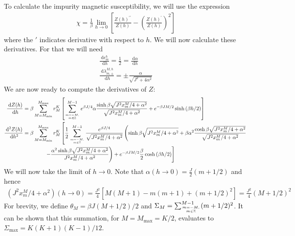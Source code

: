 \documentclass{revtex4-2}
\begin{document}
To calculate the impurity magnetic susceptibility, we will use the expression
\begin{align}
	\chi = \frac{1}{\beta}\lim_{h \to 0}\left[\frac{Z(h)^{\prime\prime}}{Z(h)} - \left(\frac{Z(h)^{\prime}}{Z(h)}\right)^2 \right] 
\end{align}
where the \(\prime\) indicates derivative with respect to \(h\). We will now calculate these derivatives. For that we will need
\begin{gather}
	\frac{\:\mathrm{d}\epsilon_m^h}{\:\mathrm{d}h} = \frac{1}{2} = \frac{\:\mathrm{d}\alpha}{\:\mathrm{d}h}\\
	\frac{\:\mathrm{d}\lambda_{m,\pm}^{M, h}}{\:\mathrm{d}h} = \pm\frac{\alpha}{\sqrt{J^2 + 4\alpha^2}}
\end{gather}
We are now ready to compute the derivatives of \(Z\):
\begin{align}
	\frac{\:\mathrm{d}Z(h)}{\:\mathrm{d}h} &= \beta\sum_{M=M_\text{min}}^{M_\text{max}}r^K_M\left[\sum_{m=-M, \atop{m\in \mathbb{Z}}}^{M-1}e^{\beta J/4}\alpha\frac{\sinh \beta\sqrt{J^2x^M_m/4 + \alpha^2} }{\sqrt{J^2x^M_m/4 + \alpha^2}} + e^{-\beta JM/2}\sinh \left(\beta h/2\right)\right] \\
	\frac{\:\mathrm{d}^2Z(h)}{\:\mathrm{d}h^2} &= \beta\sum_{M=M_\text{min}}^{M_\text{max}}r^K_M\left[\frac{1}{2}\sum_{m=-M, \atop{m\in \mathbb{Z}}}^{M-1}\frac{e^{\beta J/4}}{\sqrt{J^2x^M_m/4 + \alpha^2}}\left(\sinh \beta\sqrt{J^2x^M_m/4 + \alpha^2} + \beta\alpha^2 \frac{\cosh\beta\sqrt{J^2x^M_m/4 + \alpha^2}}{\sqrt{J^2x^M_m/4 + \alpha^2}}\right.\right.\\
						   &\quad \quad\quad \quad\left.\left. - \frac{\alpha^2 \sinh \beta\sqrt{J^2x^M_m/4 + \alpha^2}}{J^2x^M_m/4 + \alpha^2}\right) + e^{-\beta JM/2}\frac{\beta}{2}\cosh \left(\beta h/2\right)\right] \\
\end{align}
We will now take the limit of \(h \to 0\). Note that \(\alpha(h\to 0)=\frac{J}{2}(m+1/2)\) and hence 
\begin{align}
	(J^2x^M_m/4 + \alpha^2)(h \to 0) = \frac{J^2}{4}\left[M(M+1) - m(m+1) + (m+1/2)^2\right] = \frac{J^2}{4}\left( M + 1/2 \right)^2
\end{align}
For brevity, we define \(\theta_M = \beta J (M+1/2)/2\) and \(\Sigma_M = \sum_{m=-M, \atop{m\in \mathbb{Z}}}^{M-1}(m+1/2)^2\). It can be shown that this summation, for \(M=M_\text{max}=K/2\), evaluates to \(\Sigma_\text{max} = K(K+1)(K-1)/12\).
\end{document}
